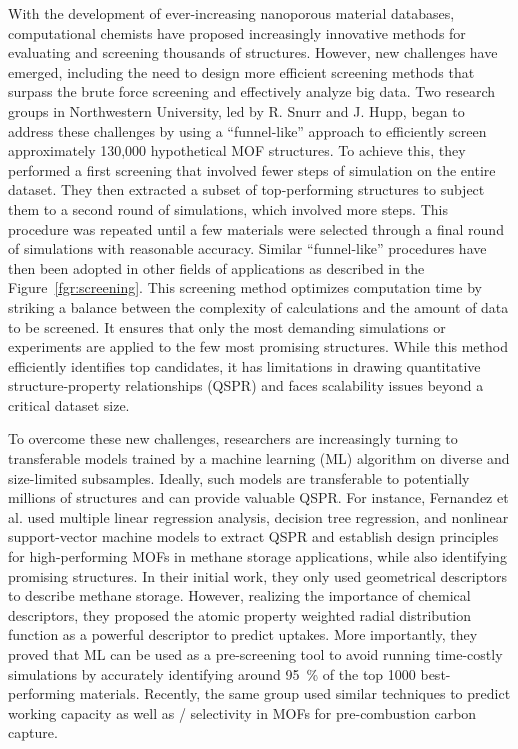 \documentclass[main.tex]{subfiles}
\begin{document}
With the development of ever-increasing nanoporous material databases, computational chemists have proposed increasingly innovative methods for evaluating and screening thousands of structures. However, new challenges have emerged, including the need to design more efficient screening methods that surpass the brute force screening and effectively analyze big data. Two research groups in Northwestern University, led by R. Snurr and J. Hupp, began to address these challenges by using a ``funnel-like'' approach to efficiently screen approximately 130,000 hypothetical MOF structures.\autocite{Wilmer_2012} To achieve this, they performed a first screening that involved fewer steps of simulation on the entire dataset. They then extracted a subset of top-performing structures to subject them to a second round of simulations, which involved more steps. This procedure was repeated until a few materials were selected through a final round of simulations with reasonable accuracy. Similar ``funnel-like'' procedures have then been adopted in other fields of applications as described in the Figure~\ref{fgr:screening}. This screening method optimizes computation time by striking a balance between the complexity of calculations and the amount of data to be screened. It ensures that only the most demanding simulations or experiments are applied to the few most promising structures. While this method efficiently identifies top candidates, it has limitations in drawing quantitative structure-property relationships (QSPR) and faces scalability issues beyond a critical dataset size.

To overcome these new challenges, researchers are increasingly turning to transferable models trained by a machine learning (ML) algorithm on diverse and size-limited subsamples. Ideally, such models are transferable to potentially millions of structures and can provide valuable QSPR. For instance, Fernandez et al.\autocite{Fernandez_2013} used multiple linear regression analysis, decision tree regression, and nonlinear support-vector machine models to extract QSPR and establish design principles for high-performing MOFs in methane storage applications, while also identifying promising structures. In their initial work, they only used geometrical descriptors to describe methane storage\autocite{Fernandez_2013}. However, realizing the importance of chemical descriptors, they proposed the atomic property weighted radial distribution function as a powerful descriptor to predict  uptakes.\autocite{Fernandez_2013_rdf} More importantly, they proved that ML can be used as a pre-screening tool to avoid running time-costly simulations by accurately identifying around \SI{95}{\percent} of the top 1000 best-performing materials. Recently, the same group used similar techniques to predict  working capacity as well as / selectivity in MOFs for pre-combustion carbon capture.\autocite{Dureckova_2019}
\end{document}
